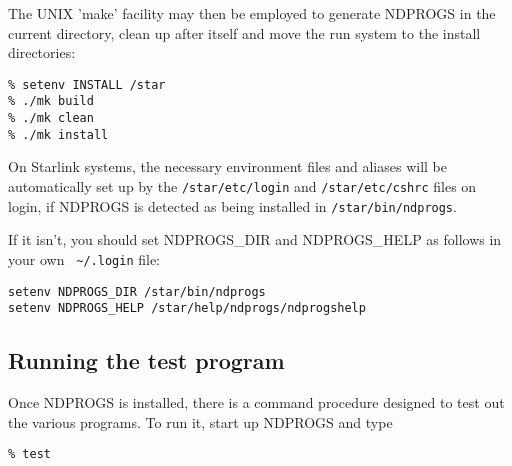 The UNIX 'make' facility may then be employed to generate NDPROGS in the
current directory, clean up after itself and move the run system to the
install directories:

\begin{myquote}
\begin{verbatim}
% setenv INSTALL /star
% ./mk build
% ./mk clean
% ./mk install
\end{verbatim}
\end{myquote}

On Starlink systems, the necessary environment files and aliases will
be automatically set up by the {\tt /star/etc/login} and {\tt /star/etc/cshrc}
files on login, if NDPROGS is detected as being installed in
{\tt /star/bin/ndprogs}.

If it isn't, you should set NDPROGS\_DIR and NDPROGS\_HELP as follows in your own
{\verb+ ~/.login+} file:

\begin{myquote}
\begin{verbatim}
setenv NDPROGS_DIR /star/bin/ndprogs
setenv NDPROGS_HELP /star/help/ndprogs/ndprogshelp
\end{verbatim}
\end{myquote}


\subsection{Running the test program}

Once NDPROGS is installed, there is a command procedure designed to test
out the various programs. To run it, start up NDPROGS and type

\begin{myquote}
\begin{verbatim}
% test
\end{verbatim}
\end{myquote}

